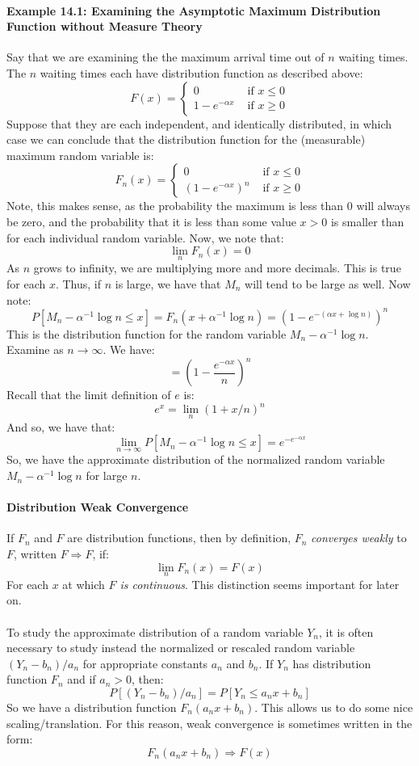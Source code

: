 \documentclass[12pt,a4paper]{article}
\newcommand{\1}[1]{\mathbbm{1}\left\{ #1 \right\}}
\begin{document}
\paragraph{Example 14.1: Examining the Asymptotic Maximum Distribution Function without Measure Theory} Say that we are examining the the maximum arrival time out of $n$ waiting times. The $n$ waiting times each have distribution function as described above:
$$
	F(x) =
	\begin{cases}
	0 & \text{ if $x \leq 0$}\\
	1 - e^{-\alpha x} & \text{ if $x \geq 0$}
	\end{cases}
$$
Suppose that they are each independent, and identically distributed, in which case we can conclude that the distribution function for the (measurable) maximum random variable is:
$$
	F_n(x) = 
	\begin{cases}
	0 & \text{ if $x \leq 0$}\\
	(1 - e^{-\alpha x})^n & \text{ if $x \geq 0$}
	\end{cases}
$$
Note, this makes sense, as the probability the maximum is less than 0 will always be zero, and the probability that it is less than some value $x > 0$ is smaller than for each individual random variable. Now, we note that:
$$
	\lim_n F_n(x) = 0
$$
As $n$ grows to infinity, we are multiplying more and more decimals. This is true for each $x$. Thus, if $n$ is large, we have that $M_n$ will tend to be large as well. Now note:
$$
	P\left[M_n - \alpha^{-1}\log n \leq x\right] =
	F_n(x + \alpha^{-1}\log n) =
	\left(1 - e^{-(\alpha x + \log n)}\right)^n
$$
This is the distribution function for the random variable $M_n - \alpha^{-1}\log n$. Examine as $n \to \infty$. We have:
$$
	= \left(1 - \frac{e^{-\alpha x}}{n}\right)^n
$$
Recall that the limit definition of $e$ is:
$$
	e^x = \lim_n (1 + x/n)^n
$$
And so, we have that:
$$
	\lim_{n \to \infty} P\left[M_n - \alpha^{-1}\log n \leq x\right] = e^{-e^{-\alpha x}}
$$
So, we have the approximate distribution of the normalized random variable $M_n - \alpha^{-1}\log n$ for large $n$.

\paragraph{Distribution Weak Convergence} If $F_n$ and $F$ are distribution functions, then by definition, $F_n$ \textit{converges weakly} to $F$, written $F \Rightarrow F$, if:
$$
	\lim_n F_n(x) = F(x)
$$
For each $x$ at which \textit{$F$ is continuous}. This distinction seems important for later on.
\\\\
To study the approximate distribution of a random variable $Y_n$, it is often necessary to study instead the normalized or rescaled random variable $(Y_n - b_n)/a_n$ for appropriate constants $a_n$ and $b_n$. If $Y_n$ has distribution function $F_n$ and if $a_n > 0$, then:
$$
	P\left[(Y_n - b_n)/a_n\right] = P\left[Y_n \leq a_nx + b_n\right]
$$
So we have a distribution function $F_n(a_nx + b_n)$. This allows us to do some nice scaling/translation. For this reason, weak convergence is sometimes written in the form:
$$
	F_n(a_nx + b_n) \Rightarrow F(x)
$$
\end{document}
